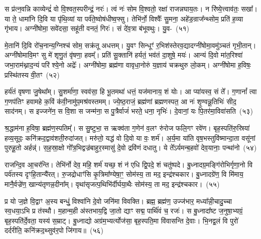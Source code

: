 {\anuvakamend[{ए॒तस्य॑ पय॒स्या॑यां पाति॒ षड्विꣳ॑शतिश्च}]}%

स प्र॑त्न॒वन्नि काव्येन्द्रं॑ वो वि॒श्वत॒स्परीन्द्रं॒ नरः॑। त्वं नः॑ सोम वि॒श्वतो॒ रक्षा॑ राजन्नघाय॒तः। न रि॑ष्ये॒त्त्वाव॑तः॒ सखा᳚। या ते॒ धामा॑नि दि॒वि या पृ॑थि॒व्यां या पर्व॑ते॒ष्वोष॑धीष्व॒फ्सु। तेभि॑र्नो॒ विश्वैः᳚ सु॒मना॒ अहे॑ड॒न्राज᳚न्थ्सोम॒ प्रति॑ ह॒व्या गृ॑भाय। अग्नी॑षोमा॒ सवे॑दसा॒ सहू॑ती वनतं॒ गिरः॑। सं दे॑व॒त्रा ब॑भूवथुः। यु॒व-~(५१)\ip

मे॒तानि॑ दि॒वि रो॑च॒नान्य॒ग्निश्च॑ सोम॒ सक्र॑तू अधत्तम्। यु॒वꣳ सिन्धूꣳ॑ र॒भिश॑स्तेरव॒द्यादग्नी॑\-षोमा॒वमु॑ञ्चतं गृभी॒तान्। अग्नी॑षोमावि॒मꣳ सु मे॑ शृणु॒तं वृ॑षणा॒ हवम्᳚। प्रति॑ सू॒क्तानि॑ हर्यतं॒ भव॑तं दा॒शुषे॒ मयः॑। आन्यं दि॒वो मा॑त॒रिश्वा॑ जभा॒राम॑थ्नाद॒न्यं परि॑ श्ये॒नो अद्रेः᳚। अग्नी॑षोमा॒ ब्रह्म॑णा वावृधा॒नोरुं य॒ज्ञाय॑ चक्रथुरु लो॒कम्। अग्नी॑षोमा ह॒विषः॒ प्रस्थि॑तस्य वी॒तꣳ~(५२)\ip

हर्य॑तं वृषणा जु॒षेथा᳚म्। सु॒शर्मा॑णा॒ स्वव॑सा॒ हि भू॒तमथा॑ धत्तं॒ यज॑मानाय॒ शं योः। आ प्या॑यस्व॒ सं ते᳚। ग॒णानां᳚ त्वा ग॒णप॑तिꣳ हवामहे क॒विं क॑वी॒नामु॑प॒मश्र॑वस्तमम्। ज्ये॒ष्ठ॒राजं॒ ब्रह्म॑णां ब्रह्मणस्पत॒ आ नः॑ शृ॒ण्वन्नू॒तिभिः॑ सीद॒ साद॑नम्। स इज्जने॑न॒ स वि॒शा स जन्म॑ना॒ स पु॒त्रैर्वाजं॑ भरते॒ धना॒ नृभिः॑। दे॒वानां॒ यः पि॒तर॑मा॒विवा॑सति~(५३)\ip

श्र॒द्धाम॑ना ह॒विषा॒ ब्रह्म॑ण॒स्पतिम्᳚। स सु॒ष्टुभा॒ स ऋक्व॑ता ग॒णेन॑ व॒लꣳ रु॑रोज फलि॒गꣳ रवे॑ण। बृह॒स्पति॑रु॒स्रिया॑ हव्य॒सूदः॒ कनि॑क्रद॒द्वाव॑शती॒रुदा॑जत्। मरु॑तो॒ यद्ध॑ वो दि॒वो या वः॒ शर्म॑। अ॒र्य॒मा या॑ति वृष॒भस्तुवि॑ष्मान्दा॒ता वसू॑नां पुरुहू॒तो अर्\mbox{}हन्न्॑। स॒ह॒स्रा॒क्षो गो᳚त्र॒भिद्वज्र॑बाहुर॒स्मासु॑ दे॒वो द्रवि॑णं दधातु। ये ते᳚\-ऽर्यमन्ब॒हवो॑ देव॒यानाः॒ पन्था॑नो~(५४)\ip

राजन्दि॒व आ॒चर॑न्ति। तेभि॑र्नो देव॒ महि॒ शर्म॑ यच्छ॒ शं न॑ एधि द्वि॒पदे॒ शं चतु॑ष्पदे। बु॒ध्नादग्र॒मङ्गि॑रोभिर्गृणा॒नो वि पर्व॑तस्य दृꣳहि॒तान्यै॑रत्। रु॒जद्रोधाꣳ॑सि कृ॒त्रिमा᳚ण्येषा॒ꣳ॒ सोम॑स्य॒ ता मद॒ इन्द्र॑श्चकार। बु॒ध्नादग्रे॑ण॒ वि मि॑माय॒ मानै॒र्वज्रे॑ण॒ खान्य॑तृणन्न॒दीना᳚म्। वृथा॑सृजत्प॒थिभि॑र्दीर्घया॒थैः सोम॑स्य॒ ता मद॒ इन्द्र॑श्चकार।~(५५)\ip

प्र यो ज॒ज्ञे वि॒द्वाꣳ अ॒स्य बन्धुं॒ विश्वा॑नि दे॒वो जनि॑मा विवक्ति। ब्रह्म॒ ब्रह्म॑ण॒ उज्ज॑भार॒ मध्या᳚न्नी॒चादु॒च्चा स्व॒धया॒\-ऽभि प्र त॑स्थौ। म॒हान्म॒ही अ॑स्तभाय॒द्वि जा॒तो द्याꣳ सद्म॒ पार्थि॑वं च॒ रजः॑। स बु॒ध्नादा᳚ष्ट ज॒नुषा॒भ्यग्रं॒ बृह॒स्पति॑र्दे॒वता॒ यस्य॑ स॒म्राट्। बु॒ध्नाद्यो अग्र॑म॒भ्यर्त्योज॑सा॒ बृह॒स्पति॒मा वि॑वासन्ति दे॒वाः। भि॒नद्व॒लं वि पुरो॑ दर्दरीति॒ कनि॑क्रद॒थ्सुव॑र॒पो जि॑गाय॥~(५६)\ip

